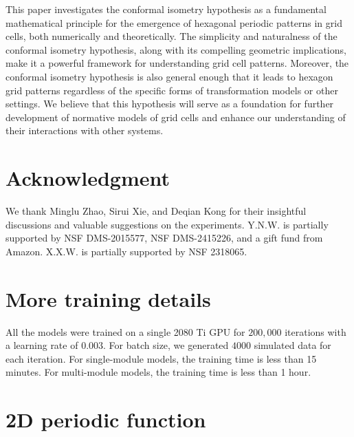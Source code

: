 \documentclass{article}
\begin{document}
This paper investigates the conformal isometry hypothesis as a fundamental mathematical principle for the emergence of hexagonal periodic patterns in grid cells, both numerically and theoretically. The simplicity and naturalness of the conformal isometry hypothesis, along with its compelling geometric implications, make it a powerful framework for understanding grid cell patterns. Moreover, the conformal isometry hypothesis is also general enough that it leads to hexagon grid patterns regardless of the specific forms of transformation models or other settings. We believe that this hypothesis will serve as a foundation for further development of normative models of grid cells and enhance our understanding of their interactions with other systems.

\newpage


\section*{Acknowledgment}
We thank Minglu Zhao, Sirui Xie, and Deqian Kong for their insightful discussions and valuable suggestions on the experiments. Y.N.W. is partially supported by NSF DMS-2015577, NSF DMS-2415226, and a gift fund from Amazon. X.X.W. is partially supported by NSF 2318065.










\appendix









\section{More training details}
\label{sec:train_detail}
All the models were trained on a single 2080 Ti GPU for $200,000$ iterations with a learning rate of $0.003$. For batch size, we generated $4000$ simulated data for each iteration. For single-module models, the training time is less than 15 minutes. For multi-module models, the training time is less than 1 hour. 



\section{2D periodic function}
\label{sec:more3}
\end{document}
